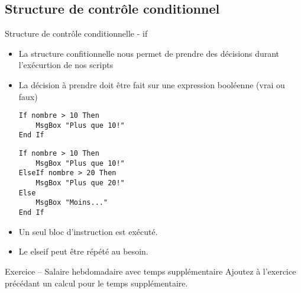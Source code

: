 \documentclass[aspectratio=169,usenames,dvipsnames]{beamer}
\begin{document}
    \subsection{Structure de contrôle conditionnel}
    \begin{frame}[fragile]{Structure de contrôle conditionnelle - if}
        \begin{itemize}
            \item La structure confitionnelle nous permet de prendre des décisions durant l’exécurtion de nos scripts
            \item La décision à prendre doit être fait sur une expression booléenne (vrai ou faux)
            
            \smallskip
\noindent\begin{minipage}{.45\textwidth}
\begin{lstlisting}
If nombre > 10 Then
    MsgBox "Plus que 10!"
End If
\end{lstlisting}
\end{minipage}\hfill
\begin{minipage}{.45\textwidth}
\begin{lstlisting}
If nombre > 10 Then
    MsgBox "Plus que 10!"
ElseIf nombre > 20 Then
    MsgBox "Plus que 20!"
Else
    MsgBox "Moins..."
End If
\end{lstlisting}
\end{minipage}
            \item Un seul bloc d’instruction est exécuté.
            \item Le elseif peut être répété au besoin.
        \end{itemize}
    \end{frame}
    \begin{frame}{Exercice – Salaire hebdomadaire avec temps supplémentaire}
        Ajoutez à l’exercice précédant un calcul pour le temps supplémentaire.
    \end{frame}
\end{document}
